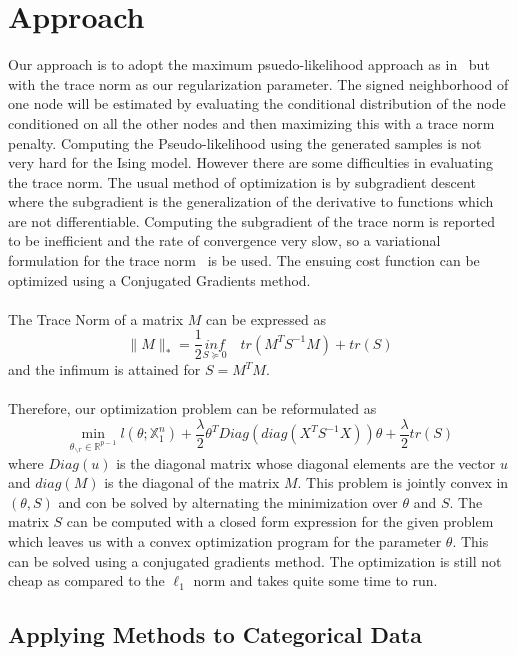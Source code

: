 \documentclass[11pt]{article}
\begin{document}
\section{Approach}

Our approach is to adopt the maximum psuedo-likelihood approach as in~\cite{ravikumar2010high} but with the trace norm as our regularization parameter. 
The signed neighborhood of one node will be estimated by evaluating the conditional distribution of the node conditioned on all the other nodes and then maximizing this with a trace norm penalty.
Computing the Pseudo-likelihood using the generated samples is not very hard for the Ising model. 
However there are some difficulties in evaluating the trace norm. 
The usual method of optimization is by subgradient descent where the subgradient is the generalization of the derivative to functions which are not differentiable. 
Computing the subgradient of the trace norm is reported to be inefficient and the rate of convergence very slow, so a variational formulation for the trace norm~\cite{grave2011trace} is be used. 
The ensuing cost function can be optimized using a Conjugated Gradients method.\\ \\
The Trace Norm of a matrix $M$ can be expressed as 
$$ \|M\|_* = \frac{1}{2} \underset{S \succeq 0}{inf} \quad  tr(M^T S^{-1} M) + tr(S)	 $$
and the infimum is attained for $S = M^T M$.\\ \\
Therefore, our optimization problem can be reformulated as
$$ \min_{\theta_{\backslash r} \in \mathbb{R}^{p-1}}  l(\theta; \mathbb{X}^n_1) + \frac{\lambda}{2} \theta^T Diag(diag(X^T S^{-1} X ))\theta + \frac{\lambda}{2} tr(S) $$ 
where $Diag(u)$ is the diagonal matrix whose diagonal elements are the vector $u$ and $diag(M)$ is the diagonal of the matrix $M$.
This problem is jointly convex in $(\theta, S)$ and con be solved by alternating the minimization over $\theta$ and $S$.
The matrix $S$ can be computed with a closed form expression for the given problem which leaves us with a convex optimization program for the parameter $\theta$.
This can be solved using a conjugated gradients method. The optimization is still not cheap as compared to the $\ell_1$ norm and takes quite some time to run. 

\subsection{Applying Methods to Categorical Data}
\end{document}
